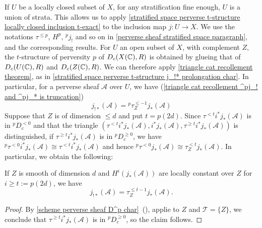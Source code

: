 If $U$ be a locally closed subset of $X$, for any stratification fine enough, $U$ is a union of strata. This allows us to apply \cref{stratified space perverse t-structure locally closed inclusion t-exact} to the inclusion map $j:U\to X$. We use the notations $\tau^{\leq p}$, $H^p$, ${^p\!j_!}$ and so on in \ref{perverse sheaf stratified space paragraph}, and the corresponding results. For $U$ an open subset of $X$, with complement $Z$, the $t$-structure of perversity $p$ of $D_c(X(\mathbb{C}),R)$ is obtained by glueing that of $D_c(U(\mathbb{C}),R)$ and $D_c(Z(\mathbb{C}),R)$. We can therefore apply \cref{triangle cat recollement theorem}, as in \cref{stratified space perverse t-structure j_!* prolongation char}. In particular, for a perverse sheaf $\mathscr{A}$ over $U$, we have (\cref{triangle cat recollement ^pj_! and ^pj_* is truncation})
\begin{equation}\label{scheme perverse sheaf j_!*}
j_{!*}(\mathscr{A})={^p\!\tau_Z^{\leq -1}}j_*(\mathscr{A})
\end{equation}
Suppose that $Z$ is of dimension $\leq d$ and put $t=p(2d)$. Since $\tau^{<t}i^*j_*(\mathscr{A})$ is in ${^p\!D_c^{<0}}$ and that the triangle $(\tau^{<t}i^*j_*(\mathscr{A}),i^*j_*(\mathscr{A}),\tau^{\geq t}i^*j_*(\mathscr{A}))$ is distinguished, if $\tau^{\geq t}i^*j_*(\mathscr{A})$ is in ${^p\!D_c^{\geq 0}}$, we have ${^p\!\tau^{<0}}i^*j_*(\mathscr{A})\cong\tau^{<t}i^*j_*(\mathscr{A})$ and hence ${^p\!\tau^{<0}}j_*(\mathscr{A})\cong\tau_Z^{<t}j_*(\mathscr{A})$. In particular, we obtain the following:

\begin{proposition}\label{scheme perverse sheaf j_!* of j_*}
If $Z$ is smooth of dimension $d$ and $H^i(j_*(\mathscr{A}))$ are locally constant over $Z$ for $i\geq t:=p(2d)$, we have
\begin{equation}\label{scheme perverse sheaf j_!* of j_*-1}
j_{!*}(\mathscr{A})=\tau_Z^{\leq t-1}j_*(\mathscr{A}).
\end{equation}
\end{proposition}
\begin{proof}
By \cref{scheme perverse sheaf D^p char}~(), applie to $Z$ and $\mathcal{T}=\{Z\}$, we conclude that $\tau^{\geq t}i^*j_*(\mathscr{A})$ is in ${^p\!D_c^{\geq 0}}$, so the claim follows.
\end{proof}

